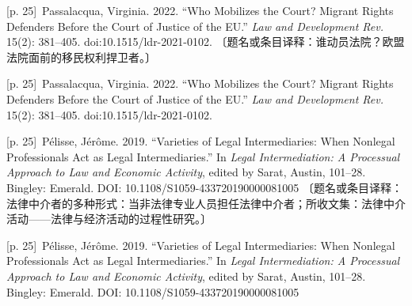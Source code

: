 \documentclass[10pt,a4paper]{article}
\begin{document}
\noindent\begin{minipage}{\textwidth}\begin{minipage}[t]{\dimexpr.5\textwidth-4mm\relax}{\scriptsize\color{gray} [p. 25]}\ Passalacqua, Virginia. 2022. “Who Mobilizes the Court? Migrant Rights Defenders Before the Court of Justice of the EU.” \textit{Law and Development Rev.} 15(2): 381–405. doi:10.1515/ldr-2021-0102. 〔题名或条目译释：谁动员法院？欧盟法院面前的移民权利捍卫者。〕\par\end{minipage}\hfill\begin{minipage}[t]{\dimexpr.5\textwidth-4mm\relax}{\scriptsize\color{gray} [p. 25]}\ Passalacqua, Virginia. 2022. “Who Mobilizes the Court? Migrant Rights Defenders Before the Court of Justice of the EU.” \textit{Law and Development Rev.} 15(2): 381–405. doi:10.1515/ldr-2021-0102.\par\end{minipage}\end{minipage}\par
\noindent\begin{minipage}{\textwidth}\begin{minipage}[t]{\dimexpr.5\textwidth-4mm\relax}{\scriptsize\color{gray} [p. 25]}\ Pélisse, Jérôme. 2019. “Varieties of Legal Intermediaries: When Nonlegal Professionals Act as Legal Intermediaries.” In \textit{Legal Intermediation: A Processual Approach to Law and Economic Activity}, edited by Sarat, Austin, 101–28. Bingley: Emerald. DOI: 10.1108/S1059-433720190000081005 〔题名或条目译释：法律中介者的多种形式：当非法律专业人员担任法律中介者；所收文集：法律中介活动——法律与经济活动的过程性研究。〕\par\end{minipage}\hfill\begin{minipage}[t]{\dimexpr.5\textwidth-4mm\relax}{\scriptsize\color{gray} [p. 25]}\ Pélisse, Jérôme. 2019. “Varieties of Legal Intermediaries: When Nonlegal Professionals Act as Legal Intermediaries.” In \textit{Legal Intermediation: A Processual Approach to Law and Economic Activity}, edited by Sarat, Austin, 101–28. Bingley: Emerald. DOI: 10.1108/S1059-433720190000081005\par\end{minipage}\end{minipage}\par
\end{document}
